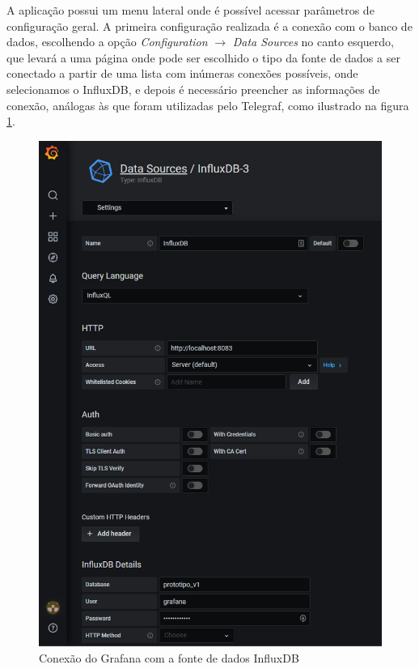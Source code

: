 \documentclass[../monografia.tex]{subfiles}
\begin{document}
A aplicação possui um menu lateral onde é possível acessar parâmetros de configuração geral. A primeira configuração realizada é a conexão com o banco de dados, escolhendo a opção \textit{Configuration} $\rightarrow$ \textit{Data Sources} no canto esquerdo, que levará a uma página onde pode ser escolhido o tipo da fonte de dados a ser conectado a partir de uma lista com inúmeras conexões possíveis, onde selecionamos o InfluxDB, e depois é necessário preencher as informações de conexão, análogas às que foram utilizadas pelo Telegraf, como ilustrado na figura \ref{fig:grafana-datasource}.

\begin{figure}[h!]
	\centering
	\includegraphics[scale=0.4]{grafana-datasource.png}
	\caption{Conexão do Grafana com a fonte de dados InfluxDB}
	\label{fig:grafana-datasource}
\end{figure}
\end{document}
